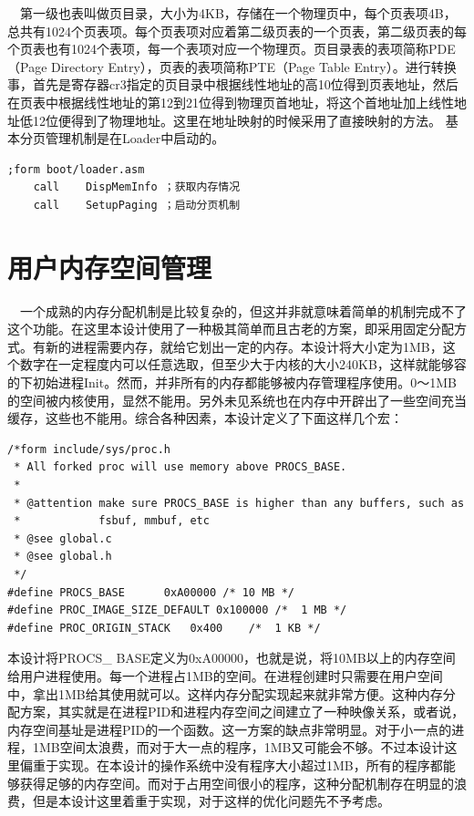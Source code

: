 \documentclass[UTF8,nofonts,cs4size]{ctexrep}
\begin{document}
\indent \ \ 
第一级也表叫做页目录，大小为4KB，存储在一个物理页中，每个页表项4B，总共有1024个页表项。每个页表项对应着第二级页表的一个页表，第二级页表的每个页表也有1024个表项，每一个表项对应一个物理页。页目录表的表项简称PDE（Page Directory Entry），页表的表项简称PTE（Page Table Entry）。进行转换事，首先是寄存器cr3指定的页目录中根据线性地址的高10位得到页表地址，然后在页表中根据线性地址的第12到21位得到物理页首地址，将这个首地址加上线性地址低12位便得到了物理地址。这里在地址映射的时候采用了直接映射的方法。
基本分页管理机制是在Loader中启动的。
\begin{lstlisting}
;form boot/loader.asm
	call	DispMemInfo ；获取内存情况
	call	SetupPaging ；启动分页机制
\end{lstlisting}
\section{用户内存空间管理}
\indent \ \ 
一个成熟的内存分配机制是比较复杂的，但这并非就意味着简单的机制完成不了这个功能。在这里本设计使用了一种极其简单而且古老的方案，即采用固定分配方式。有新的进程需要内存，就给它划出一定的内存。本设计将大小定为1MB，这个数字在一定程度内可以任意选取，但至少大于内核的大小240KB，这样就能够容的下初始进程Init。然而，并非所有的内存都能够被内存管理程序使用。0～1MB的空间被内核使用，显然不能用。另外未见系统也在内存中开辟出了一些空间充当缓存，这些也不能用。综合各种因素，本设计定义了下面这样几个宏：
\begin{lstlisting}
/*form include/sys/proc.h
 * All forked proc will use memory above PROCS_BASE.
 *
 * @attention make sure PROCS_BASE is higher than any buffers, such as
 *            fsbuf, mmbuf, etc
 * @see global.c
 * @see global.h
 */
#define	PROCS_BASE		0xA00000 /* 10 MB */
#define	PROC_IMAGE_SIZE_DEFAULT	0x100000 /*  1 MB */
#define	PROC_ORIGIN_STACK	0x400    /*  1 KB */
\end{lstlisting}
本设计将PROCS\_ BASE定义为0xA00000，也就是说，将10MB以上的内存空间给用户进程使用。每一个进程占1MB的空间。在进程创建时只需要在用户空间中，拿出1MB给其使用就可以。这样内存分配实现起来就非常方便。这种内存分配方案，其实就是在进程PID和进程内存空间之间建立了一种映像关系，或者说，内存空间基址是进程PID的一个函数。这一方案的缺点非常明显。对于小一点的进程，1MB空间太浪费，而对于大一点的程序，1MB又可能会不够。不过本设计这里偏重于实现。在本设计的操作系统中没有程序大小超过1MB，所有的程序都能够获得足够的内存空间。而对于占用空间很小的程序，这种分配机制存在明显的浪费，但是本设计这里着重于实现，对于这样的优化问题先不予考虑。
\end{document}
